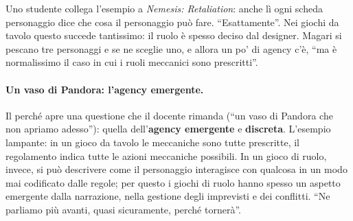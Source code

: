 Uno studente collega l'esempio a \emph{Nemesis: Retaliation}: anche lì ogni scheda
personaggio dice che cosa il personaggio può fare. ``Esattamente''. Nei giochi da
tavolo questo succede tantissimo: il ruolo è spesso deciso dal designer. Magari si
pescano tre personaggi e se ne sceglie uno, e allora un po' di agency c'è, ``ma è
normalissimo il caso in cui i ruoli meccanici sono prescritti''.

\paragraph{Un vaso di Pandora: l'agency emergente.} Il perché apre una questione che
il docente rimanda (``un vaso di Pandora che non apriamo adesso''): quella
dell'\textbf{agency emergente} e \textbf{discreta}. L'esempio lampante: in un gioco
da tavolo le meccaniche sono tutte prescritte, il regolamento indica tutte le azioni
meccaniche possibili. In un gioco di ruolo, invece, si può descrivere come il
personaggio interagisce con qualcosa in un modo mai codificato dalle regole; per
questo i giochi di ruolo hanno spesso un aspetto emergente dalla narrazione, nella
gestione degli imprevisti e dei conflitti. ``Ne parliamo più avanti, quasi
sicuramente, perché tornerà''.

